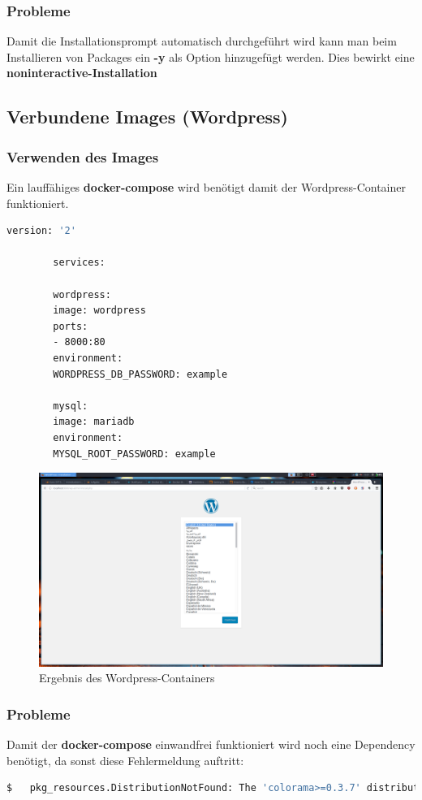 		\subsubsection{Probleme}
		Damit die Installationsprompt automatisch durchgeführt wird kann man beim Installieren von Packages ein \textbf{-y} als Option hinzugefügt werden. Dies bewirkt eine \textbf{noninteractive-Installation}
		
	\subsection{Verbundene Images (Wordpress)}
		\subsubsection{Verwenden des Images}
		Ein lauffähiges \textbf{docker-compose} wird benötigt damit der Wordpress-Container funktioniert.
		
		\begin{lstlisting}[language=bash,caption={docker-compose.yml}]
		version: '2'
		
		services:
		
		wordpress:
		image: wordpress
		ports:
		- 8000:80
		environment:
		WORDPRESS_DB_PASSWORD: example
		
		mysql:
		image: mariadb
		environment:
		MYSQL_ROOT_PASSWORD: example
		\end{lstlisting}
					
		\begin{figure}[!h]
			\begin{center}
				\includegraphics[width=0.8\linewidth]{images/wp}
				\caption{Ergebnis des Wordpress-Containers}
				\label{broker}
			\end{center}
		\end{figure}
		
		\subsubsection{Probleme}
		Damit der \textbf{docker-compose} einwandfrei funktioniert wird noch eine Dependency benötigt, da sonst diese Fehlermeldung auftritt:
				\begin{lstlisting}[language=bash,caption={pip Installationsanweisung}]
				$	pkg_resources.DistributionNotFound: The 'colorama>=0.3.7' distribution was not found and is required by docker-compose
				\end{lstlisting}

